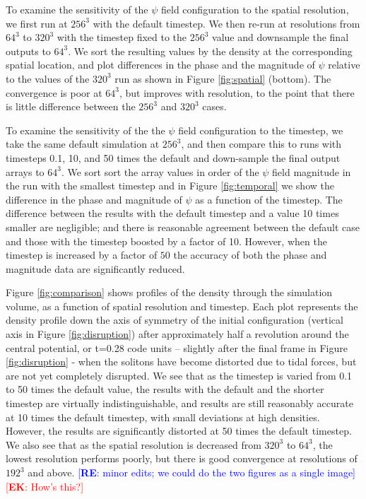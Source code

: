 \documentclass[a4paper,11pt]{article}
\newcommand{\re}[1]{\textcolor{blue}{[{\bf RE}: #1]}}
\newcommand{\ek}[1]{\textcolor{red}{[{\bf EK}: #1]}}
\begin{document}
To examine the sensitivity of the  $\psi$ field configuration to the spatial resolution, we first run at $256^3$ with the default timestep. We then re-run  at resolutions  from $64^3$ to $320^3$ with the timestep fixed to the  $256^3$ value and downsample the final outputs to $64^3$. We  sort the resulting values by  the density at the corresponding spatial location, and plot differences in the phase and the magnitude of $\psi$ relative to the values of the $320^3$ run as shown in Figure \ref{fig:spatial} (bottom).  The convergence is poor at $64^3$, but improves with resolution, to the point that there is little difference between the  $256^3$ and $320^3$ cases.

To examine the sensitivity of the the  $\psi$ field configuration to the timestep, we take the same default simulation at $256^3$, and then compare this to runs with timesteps 0.1, 10, and 50 times the default and down-sample the final output arrays to $64^3$. We sort sort the array values in order of the $\psi$ field magnitude in the run with the smallest timestep and in Figure \ref{fig:temporal}  we show the difference in the phase and magnitude of $\psi$ as a function of the timestep.  The difference between the results with the default timestep and a value 10 times smaller are negligible; and there is reasonable agreement between the default case and those with the timestep boosted by a factor of 10. However, when the timestep is increased by a factor of $50$ the accuracy of both the phase and magnitude data are significantly reduced.

Figure \ref{fig:comparison} shows profiles of the density through the simulation volume, as a function of spatial resolution and timestep.  Each plot represents the density profile down the axis of symmetry of the initial configuration (vertical axis in Figure \ref{fig:disruption}) after approximately half a revolution around the central potential, or t=0.28 code units -- slightly after the final frame in Figure \ref{fig:disruption} - when the solitons have become distorted due to tidal forces, but are not yet completely disrupted. We see that as the timestep is varied from 0.1 to 50 times the default value, the results with the default and the shorter timestep are virtually indistinguishable, and results are still reasonably accurate at 10 times the default timestep, with small deviations at high densities. However, the results are significantly distorted at 50 times the default timestep. We also see that as the spatial resolution is decreased from $320^3$ to $64^3$, the lowest resolution performs poorly, but there is good convergence  at resolutions of $192^3$ and above. \re{minor edits; we could do the two figures as a single image}\ek{How's this?}
\end{document}
